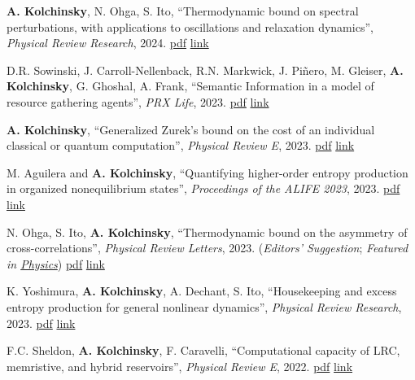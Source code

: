 
\newcommand{\pdflink}[1]{\href{https://artemyk.github.io/assets/pdf/papers/#1.pdf}{pdf}}
\newcommand{\publink}[1]{\href{#1}{link}}

\textbf{A. Kolchinsky}, N. Ohga, S. Ito, ``Thermodynamic bound on spectral perturbations, with applications to oscillations and relaxation dynamics'', \emph{Physical Review Research}, 2024. \pdflink{Kolchinsky_Ohga_Ito_ThermodynamicBoundOnSpectralPerturbations} \publink{https://journals.aps.org/prresearch/pdf/10.1103/PhysRevResearch.6.013082}

D.R. Sowinski, J. Carroll-Nellenback, R.N. Markwick, J. Piñero, M. Gleiser, \textbf{A. Kolchinsky}, G. Ghoshal, A. Frank, ``Semantic Information in a model of resource gathering agents'', \emph{PRX Life}, 2023. \pdflink{Sowinski-SemanticInformationInAModelOfResourceGatheringAgents} \publink{https://journals.aps.org/prxlife/abstract/10.1103/PRXLife.1.023003}

\textbf{A. Kolchinsky}, ``Generalized Zurek's bound on the cost of an individual classical or quantum computation'', \emph{Physical Review E}, 2023. \pdflink{Kolchinsky_2023_GeneralizedZureksBound} \publink{https://journals.aps.org/pre/abstract/10.1103/PhysRevE.108.034101}

M. Aguilera and \textbf{A. Kolchinsky}, ``Quantifying higher-order entropy production in organized nonequilibrium states'', \emph{Proceedings of the ALIFE 2023}, 2023. \pdflink{Aguilera_2023_QuantifyingHigherOrderEP} \publink{https://direct.mit.edu/isal/proceedings/isal/35/45/116909}

N. Ohga, S. Ito, \textbf{A. Kolchinsky}, ``Thermodynamic bound on the asymmetry of cross-correlations'', \emph{Physical Review Letters}, 2023. (\emph{Editors' Suggestion}; \emph{Featured in \href{https://physics.aps.org/articles/v16/142}{Physics}}) \pdflink{Ohga_Ito_Kolchinsky_2023_ThermodynamicBoundOnTheAsymmetryOfCrossCorrelations} \publink{https://journals.aps.org/prl/abstract/10.1103/PhysRevLett.131.077101}

K. Yoshimura, \textbf{A. Kolchinsky}, A. Dechant, S. Ito, ``Housekeeping and excess entropy production for general nonlinear dynamics'', 
\emph{Physical Review Research}, 2023. \pdflink{Yoshimura_PRR_2023} \publink{https://journals.aps.org/prresearch/abstract/10.1103/PhysRevResearch.5.013017}

F.C. Sheldon, \textbf{A. Kolchinsky}, F. Caravelli, ``Computational capacity of LRC, memristive, and hybrid reservoirs'', \emph{Physical Review E}, 2022. \pdflink{Sheldon_LRC_PRE_2022} \publink{https://journals.aps.org/pre/abstract/10.1103/PhysRevE.106.045310}

